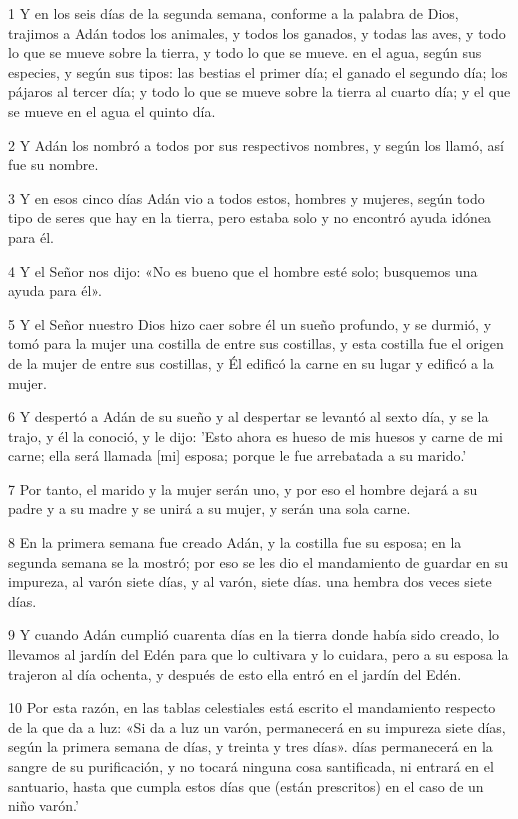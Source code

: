 \par 1 Y en los seis días de la segunda semana, conforme a la palabra de Dios, trajimos a Adán todos los animales, y todos los ganados, y todas las aves, y todo lo que se mueve sobre la tierra, y todo lo que se mueve. en el agua, según sus especies, y según sus tipos: las bestias el primer día; el ganado el segundo día; los pájaros al tercer día; y todo lo que se mueve sobre la tierra al cuarto día; y el que se mueve en el agua el quinto día.
\par 2 Y Adán los nombró a todos por sus respectivos nombres, y según los llamó, así fue su nombre.
\par 3 Y en esos cinco días Adán vio a todos estos, hombres y mujeres, según todo tipo de seres que hay en la tierra, pero estaba solo y no encontró ayuda idónea para él.
\par 4 Y el Señor nos dijo: «No es bueno que el hombre esté solo; busquemos una ayuda para él».
\par 5 Y el Señor nuestro Dios hizo caer sobre él un sueño profundo, y se durmió, y tomó para la mujer una costilla de entre sus costillas, y esta costilla fue el origen de la mujer de entre sus costillas, y Él edificó la carne en su lugar y edificó a la mujer.
\par 6 Y despertó a Adán de su sueño y al despertar se levantó al sexto día, y se la trajo, y él la conoció, y le dijo: 'Esto ahora es hueso de mis huesos y carne de mi carne; ella será llamada [mi] esposa; porque le fue arrebatada a su marido.'
\par 7 Por tanto, el marido y la mujer serán uno, y por eso el hombre dejará a su padre y a su madre y se unirá a su mujer, y serán una sola carne.
\par 8 En la primera semana fue creado Adán, y la costilla fue su esposa; en la segunda semana se la mostró; por eso se les dio el mandamiento de guardar en su impureza, al varón siete días, y al varón, siete días. una hembra dos veces siete días.
\par 9 Y cuando Adán cumplió cuarenta días en la tierra donde había sido creado, lo llevamos al jardín del Edén para que lo cultivara y lo cuidara, pero a su esposa la trajeron al día ochenta, y después de esto ella entró en el jardín del Edén.
\par 10 Por esta razón, en las tablas celestiales está escrito el mandamiento respecto de la que da a luz: «Si da a luz un varón, permanecerá en su impureza siete días, según la primera semana de días, y treinta y tres días». días permanecerá en la sangre de su purificación, y no tocará ninguna cosa santificada, ni entrará en el santuario, hasta que cumpla estos días que (están prescritos) en el caso de un niño varón.'
